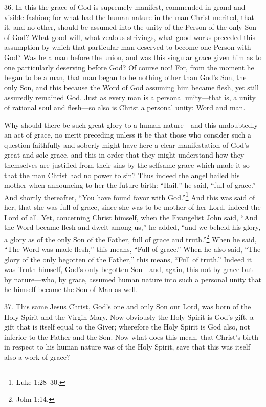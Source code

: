 
36. In this the grace of God is supremely manifest, commended in grand and visible fashion; for what had the human nature in the man Christ merited, that it, and no other, should be assumed into the unity of the Person of the only Son of God? What good will, what zealous strivings, what good works preceded this assumption by which that particular man deserved to become one Person with God? Was he a man before the union, and was this singular grace given him as to one particularly deserving before God? Of course not! For, from the moment he began to be a man, that man began to be nothing other than God's Son, the only Son, and this because the Word of God assuming him became flesh, yet still assuredly remained God. Just as every man is a personal unity—that is, a unity of rational soul and flesh—so also is Christ a personal unity: Word and man.

Why should there be such great glory to a human nature—and this undoubtedly an act of grace, no merit preceding unless it be that those who consider such a question faithfully and soberly might have here a clear manifestation of God's great and sole grace, and this in order that they might understand how they themselves are justified from their sins by the selfsame grace which made it so that the man Christ had no power to sin? Thus indeed the angel hailed his mother when announcing to her the future birth: ``Hail,'' he said, ``full of grace.'' And shortly thereafter, ``You have found favor with God.''\footnote{Luke 1:28–30.} And this was said of her, that she was full of grace, since she was to be mother of her Lord, indeed the Lord of all. Yet, concerning Christ himself, when the Evangelist John said, ``And the Word became flesh and dwelt among us,'' he added, ``and we beheld his glory, a glory as of the only Son of the Father, full of grace and truth.''\footnote{John 1:14.} When he said, ``The Word was made flesh,'' this means, ``Full of grace.'' When he also said, ``The glory of the only begotten of the Father,'' this means, ``Full of truth.'' Indeed it was Truth himself, God's only begotten Son—and, again, this not by grace but by nature—who, by grace, assumed human nature into such a personal unity that he himself became the Son of Man as well.

37. This same Jesus Christ, God's one and only Son our Lord, was born of the Holy Spirit and the Virgin Mary. Now obviously the Holy Spirit is God's gift, a gift that is itself equal to the Giver; wherefore the Holy Spirit is God also, not inferior to the Father and the Son. Now what does this mean, that Christ's birth in respect to his human nature was of the Holy Spirit, save that this was itself also a work of grace?

